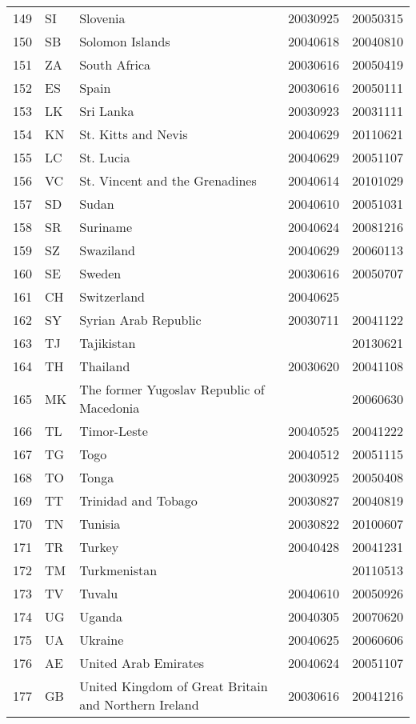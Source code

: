 \begin{longtable}{rllrr}
  149 & SI & Slovenia & 20030925 & 20050315 \\ 
  150 & SB & Solomon Islands & 20040618 & 20040810 \\ 
  151 & ZA & South Africa & 20030616 & 20050419 \\ 
  152 & ES & Spain & 20030616 & 20050111 \\ 
  153 & LK & Sri Lanka & 20030923 & 20031111 \\ 
  154 & KN & St. Kitts and Nevis & 20040629 & 20110621 \\ 
  155 & LC & St. Lucia & 20040629 & 20051107 \\ 
  156 & VC & St. Vincent and the Grenadines & 20040614 & 20101029 \\ 
  157 & SD & Sudan & 20040610 & 20051031 \\ 
  158 & SR & Suriname & 20040624 & 20081216 \\ 
  159 & SZ & Swaziland & 20040629 & 20060113 \\ 
  160 & SE & Sweden & 20030616 & 20050707 \\ 
  161 & CH & Switzerland & 20040625 &  \\ 
  162 & SY & Syrian Arab Republic & 20030711 & 20041122 \\ 
  163 & TJ & Tajikistan &  & 20130621 \\ 
  164 & TH & Thailand & 20030620 & 20041108 \\ 
  165 & MK & The former Yugoslav Republic of Macedonia &  & 20060630 \\ 
  166 & TL & Timor-Leste & 20040525 & 20041222 \\ 
  167 & TG & Togo & 20040512 & 20051115 \\ 
  168 & TO & Tonga & 20030925 & 20050408 \\ 
  169 & TT & Trinidad and Tobago & 20030827 & 20040819 \\ 
  170 & TN & Tunisia & 20030822 & 20100607 \\ 
  171 & TR & Turkey & 20040428 & 20041231 \\ 
  172 & TM & Turkmenistan &  & 20110513 \\ 
  173 & TV & Tuvalu & 20040610 & 20050926 \\ 
  174 & UG & Uganda & 20040305 & 20070620 \\ 
  175 & UA & Ukraine & 20040625 & 20060606 \\ 
  176 & AE & United Arab Emirates & 20040624 & 20051107 \\ 
  177 & GB & United Kingdom of Great Britain and Northern Ireland & 20030616 & 20041216 \\ 

\end{longtable}
